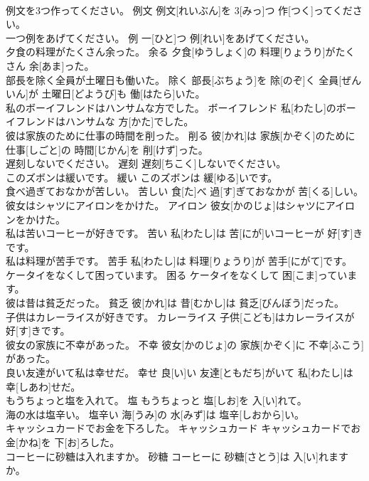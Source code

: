 \documentclass[8pt]{extreport}
\begin{document}
\begin{CJK}{UTF8}{min}
\\	例文を3つ作ってください。	例文	例文[れいぶん]を 3[みっ]つ 作[つく]ってください。	
\\	一つ例をあげてください。	例	一[ひと]つ 例[れい]をあげてください。	
\\	夕食の料理がたくさん余った。	余る	夕食[ゆうしょく]の 料理[りょうり]がたくさん 余[あま]った。	
\\	部長を除く全員が土曜日も働いた。	除く	部長[ぶちょう]を 除[のぞ]く 全員[ぜんいん]が 土曜日[どようび]も 働[はたら]いた。	
\\	私のボーイフレンドはハンサムな方でした。	ボーイフレンド	私[わたし]のボーイフレンドはハンサムな 方[かた]でした。	
\\	彼は家族のために仕事の時間を削った。	削る	彼[かれ]は 家族[かぞく]のために 仕事[しごと]の 時間[じかん]を 削[けず]った。	
\\	遅刻しないでください。	遅刻	遅刻[ちこく]しないでください。	
\\	このズボンは緩いです。	緩い	このズボンは 緩[ゆる]いです。	
\\	食べ過ぎておなかが苦しい。	苦しい	食[た]べ 過[す]ぎておなかが 苦[くる]しい。	
\\	彼女はシャツにアイロンをかけた。	アイロン	彼女[かのじょ]はシャツにアイロンをかけた。	
\\	私は苦いコーヒーが好きです。	苦い	私[わたし]は 苦[にが]いコーヒーが 好[す]きです。	
\\	私は料理が苦手です。	苦手	私[わたし]は 料理[りょうり]が 苦手[にがて]です。	
\\	ケータイをなくして困っています。	困る	ケータイをなくして 困[こま]っています。	
\\	彼は昔は貧乏だった。	貧乏	彼[かれ]は 昔[むかし]は 貧乏[びんぼう]だった。	
\\	子供はカレーライスが好きです。	カレーライス	子供[こども]はカレーライスが 好[す]きです。	
\\	彼女の家族に不幸があった。	不幸	彼女[かのじょ]の 家族[かぞく]に 不幸[ふこう]があった。	
\\	良い友達がいて私は幸せだ。	幸せ	良[い]い 友達[ともだち]がいて 私[わたし]は 幸[しあわ]せだ。	
\\	もうちょっと塩を入れて。	塩	もうちょっと 塩[しお]を 入[い]れて。	
\\	海の水は塩辛い。	塩辛い	海[うみ]の 水[みず]は 塩辛[しおから]い。	
\\	キャッシュカードでお金を下ろした。	キャッシュカード	キャッシュカードでお 金[かね]を 下[お]ろした。	
\\	コーヒーに砂糖は入れますか。	砂糖	コーヒーに 砂糖[さとう]は 入[い]れますか。	

\end{CJK}
\end{document}
